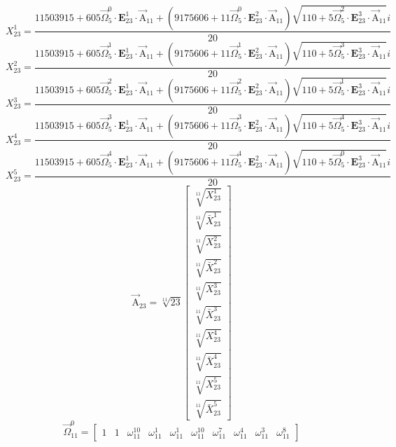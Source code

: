 \documentclass{article}
\begin{document}
\begin{enumerate}
\[ X_{23}^{1}=\frac{11503915+605\vec{\Omega}_{5}^{0}\cdot\boldsymbol{E}_{23}^{1}\cdot\vec{\mathrm{A}}_{11}+(9175606+11\vec{\Omega}_{5}^{0}\cdot\boldsymbol{E}_{23}^{2}\cdot\vec{\mathrm{A}}_{11})\sqrt{110+5\vec{\Omega}_{5}^{2}\cdot\boldsymbol{E}_{23}^{3}\cdot\vec{\mathrm{A}}_{11}}i}{20} \]
\[ X_{23}^{2}=\frac{11503915+605\vec{\Omega}_{5}^{1}\cdot\boldsymbol{E}_{23}^{1}\cdot\vec{\mathrm{A}}_{11}+(9175606+11\vec{\Omega}_{5}^{1}\cdot\boldsymbol{E}_{23}^{2}\cdot\vec{\mathrm{A}}_{11})\sqrt{110+5\vec{\Omega}_{5}^{3}\cdot\boldsymbol{E}_{23}^{3}\cdot\vec{\mathrm{A}}_{11}}i}{20} \]
\[ X_{23}^{3}=\frac{11503915+605\vec{\Omega}_{5}^{2}\cdot\boldsymbol{E}_{23}^{1}\cdot\vec{\mathrm{A}}_{11}+(9175606+11\vec{\Omega}_{5}^{2}\cdot\boldsymbol{E}_{23}^{2}\cdot\vec{\mathrm{A}}_{11})\sqrt{110+5\vec{\Omega}_{5}^{1}\cdot\boldsymbol{E}_{23}^{3}\cdot\vec{\mathrm{A}}_{11}}i}{20} \]
\[ X_{23}^{4}=\frac{11503915+605\vec{\Omega}_{5}^{3}\cdot\boldsymbol{E}_{23}^{1}\cdot\vec{\mathrm{A}}_{11}+(9175606+11\vec{\Omega}_{5}^{3}\cdot\boldsymbol{E}_{23}^{2}\cdot\vec{\mathrm{A}}_{11})\sqrt{110+5\vec{\Omega}_{5}^{4}\cdot\boldsymbol{E}_{23}^{3}\cdot\vec{\mathrm{A}}_{11}}i}{20} \]
\[ X_{23}^{5}=\frac{11503915+605\vec{\Omega}_{5}^{4}\cdot\boldsymbol{E}_{23}^{1}\cdot\vec{\mathrm{A}}_{11}+(9175606+11\vec{\Omega}_{5}^{4}\cdot\boldsymbol{E}_{23}^{2}\cdot\vec{\mathrm{A}}_{11})\sqrt{110+5\vec{\Omega}_{5}^{0}\cdot\boldsymbol{E}_{23}^{3}\cdot\vec{\mathrm{A}}_{11}}i}{20} \]
\[ \vec{\mathrm{A}}_{23}=\sqrt[11]{23}\left[ \begin{matrix} \sqrt[11]{X_{23}^{1}} \\ \sqrt[11]{\bar{X}_{23}^{1}} \\ \sqrt[11]{X_{23}^{2}} \\ \sqrt[11]{\bar{X}_{23}^{2}} \\ \sqrt[11]{X_{23}^{3}} \\ \sqrt[11]{\bar{X}_{23}^{3}} \\ \sqrt[11]{X_{23}^{4}} \\ \sqrt[11]{\bar{X}_{23}^{4}} \\ \sqrt[11]{X_{23}^{5}} \\ \sqrt[11]{\bar{X}_{23}^{5}} \end{matrix} \right] \]
\[ \overrightarrow{\Omega}_{11}^{0}=\left[ \begin{matrix} 1 & 1 & \omega_{11}^{10} & \omega_{11}^{1} & \omega_{11}^{1} & \omega_{11}^{10} & \omega_{11}^{7} & \omega_{11}^{4} & \omega_{11}^{3} & \omega_{11}^{8} \end{matrix} \right] \]


\end{enumerate}
\end{document}
